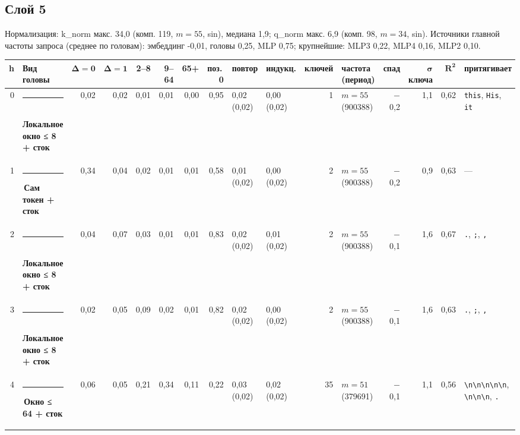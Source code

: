 \documentclass[10pt]{article}
\begin{document}
\noindent\begin{minipage}{\linewidth}
\subsection*{Слой 5}
{\small\color{ink2} Нормализация: k\_norm макс. 34,0 (комп. 119, $m{=}55$, sin), медиана 1,9; q\_norm макс. 6,9 (комп. 98, $m{=}34$, sin). Источники главной частоты запроса (среднее по головам): эмбеддинг -0,01, головы 0,25, MLP 0,75; крупнейшие: MLP3 0,22, MLP4 0,16, MLP2 0,10.}
\begin{center}{\footnotesize\begin{tabular}{|r|l|r|r|r|r|r|r|l|l|r|l|r|r|r|l|}
\hline
\rowcolor{head}\textbf{h} & \textbf{Вид головы} & $\boldsymbol{\Delta{=}0}$ & $\boldsymbol{\Delta{=}1}$ & \textbf{2–8} & \textbf{9–64} & \textbf{65+} & \textbf{поз.\,0} & \textbf{повтор} & \textbf{индукц.} & \textbf{ключей} & \textbf{частота (период)} & \textbf{спад} & $\boldsymbol{\sigma}$ \textbf{ключа} & $\boldsymbol{R^2}$ & \textbf{притягивает} \\ \hline
0 & \textcolor[HTML]{1BAF7A}{\rule{0.62em}{0.62em}}\,\textbf{Локальное окно ≤ 8 + сток} & 0,02 & 0,02 & 0,01 & 0,01 & 0,00 & 0,95 & 0,02 (0,02) & 0,00 (0,02) & 1 & $m{=}55$ (900388) & $-$0,2 & 1,1 & 0,62 & \texttt{\textvisiblespace{}this}, \texttt{\textvisiblespace{}His}, \texttt{\textvisiblespace{}it} \\ \hline
1 & \textcolor[HTML]{2A78D6}{\rule{0.62em}{0.62em}}\,\textbf{Сам токен + сток} & 0,34 & 0,04 & 0,02 & 0,01 & 0,01 & 0,58 & 0,01 (0,02) & 0,00 (0,02) & 2 & $m{=}55$ (900388) & $-$0,2 & 0,9 & 0,63 & — \\ \hline
2 & \textcolor[HTML]{1BAF7A}{\rule{0.62em}{0.62em}}\,\textbf{Локальное окно ≤ 8 + сток} & 0,04 & 0,07 & 0,03 & 0,01 & 0,01 & 0,83 & 0,02 (0,02) & 0,01 (0,02) & 2 & $m{=}55$ (900388) & $-$0,1 & 1,6 & 0,67 & \texttt{\textvisiblespace{}.}, \texttt{\textvisiblespace{};}, \texttt{\textvisiblespace{},} \\ \hline
3 & \textcolor[HTML]{1BAF7A}{\rule{0.62em}{0.62em}}\,\textbf{Локальное окно ≤ 8 + сток} & 0,02 & 0,05 & 0,09 & 0,02 & 0,01 & 0,82 & 0,02 (0,02) & 0,00 (0,02) & 2 & $m{=}55$ (900388) & $-$0,1 & 1,6 & 0,63 & \texttt{\textvisiblespace{}.}, \texttt{\textvisiblespace{};}, \texttt{\textvisiblespace{},} \\ \hline
4 & \textcolor[HTML]{EDA100}{\rule{0.62em}{0.62em}}\,\textbf{Окно ≤ 64 + сток} & 0,06 & 0,05 & 0,21 & 0,34 & 0,11 & 0,22 & 0,03 (0,02) & 0,02 (0,02) & 35 & $m{=}51$ (379691) & $-$0,1 & 1,1 & 0,56 & \texttt{\textvisiblespace{}\textbackslash{}n\textbackslash{}n\textbackslash{}n\textbackslash{}n\textbackslash{}n}, \texttt{\textvisiblespace{}\textbackslash{}n\textbackslash{}n\textbackslash{}n}, \texttt{\textvisiblespace{}.} \\ \hline

\end{tabular}}
\end{center}
\end{minipage}
\end{document}
